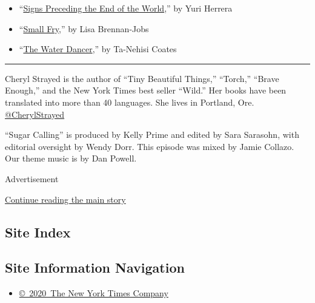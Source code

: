 \begin{itemize}
\item
  ``\href{https://www.amazon.com/dp/B00U58TZH6/ref=dp-kindle-redirect?_encoding=UTF8\&btkr=1}{Signs
  Preceding the End of the World},'' by Yuri Herrera
\item
  ``\href{https://groveatlantic.com/book/small-fry/}{Small Fry},'' by
  Lisa Brennan-Jobs
\item
  ``\href{https://www.penguinrandomhouse.com/books/550171/the-water-dancer-by-ta-nehisi-coates/}{The
  Water Dancer},'' by Ta-Nehisi Coates
\end{itemize}

\begin{center}\rule{0.5\linewidth}{\linethickness}\end{center}

Cheryl Strayed is the author of ``Tiny Beautiful Things,'' ``Torch,''
``Brave Enough,'' and the New York Times best seller ``Wild.'' Her books
have been translated into more than 40 languages. She lives in Portland,
Ore.
\href{https://twitter.com/CherylStrayed?ref_src=twsrc\%5Egoogle\%7Ctwcamp\%5Eserp\%7Ctwgr\%5Eauthor}{@CherylStrayed}

``Sugar Calling'' is produced by Kelly Prime and edited by Sara
Sarasohn, with editorial oversight by Wendy Dorr. This episode was mixed
by Jamie Collazo. Our theme music is by Dan Powell.

Advertisement

\protect\hyperlink{after-bottom}{Continue reading the main story}

\hypertarget{site-index}{%
\subsection{Site Index}\label{site-index}}

\hypertarget{site-information-navigation}{%
\subsection{Site Information
Navigation}\label{site-information-navigation}}

\begin{itemize}
\tightlist
\item
  \href{https://help.nytimes3xbfgragh.onion/hc/en-us/articles/115014792127-Copyright-notice}{©~2020~The
  New York Times Company}
\end{itemize}

